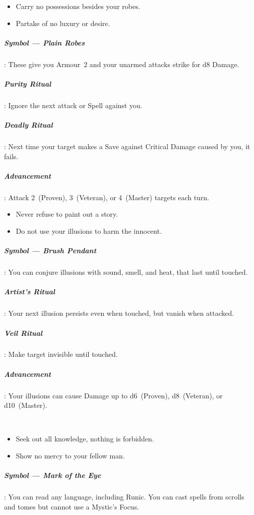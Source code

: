 \documentclass[itdr]{subfiles}
\begin{document}
\vfill

{\em\begin{itemize}
		\item Carry no possessions besides your robes.
		\item Partake of no luxury or desire.
\end{itemize}}

\subparagraph{Symbol --- Plain Robes}: These give you Armour~2 and your unarmed attacks strike for d8 Damage.

\subparagraph{Purity Ritual}: Ignore the next attack or Spell against you.

\subparagraph{Deadly Ritual}: Next time your target makes a Save against Critical Damage caused by you, it fails.

\subparagraph{Advancement}: Attack 2~(Proven), 3~(Veteran), or 4~(Master) targets each turn.

\vfill

{\em\begin{itemize}
		\item Never refuse to paint out a story.
		\item Do not use your illusions to harm the innocent.
\end{itemize}}

\subparagraph{Symbol --- Brush Pendant}: You can conjure illusions with sound, smell, and heat, that last until touched.

\subparagraph{Artist's Ritual}: Your next illusion persists even when touched, but vanish when attacked.

\subparagraph{Veil Ritual}: Make target invisible until touched.

\subparagraph{Advancement}: Your illusions can cause Damage up to d6~(Proven), d8~(Veteran), or d10~(Master).

\vfill
\break

~\vspace{0.75em}

{\em\begin{itemize}
		\item Seek out all knowledge, nothing is forbidden.
		\item Show no mercy to your fellow man.
\end{itemize}}

\subparagraph{Symbol --- Mark of the Eye}: You can read any language, including Runic. You can cast spells from scrolls and tomes but cannot use a Mystic's Focus.
\end{document}
